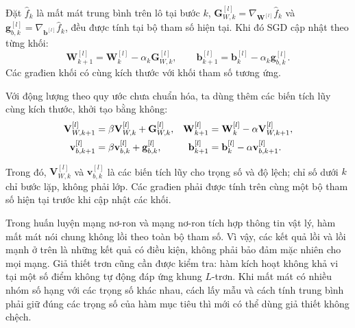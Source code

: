 Đặt $\widehat f_k$ là mất mát trung bình trên lô tại bước $k$,
$\mathbf{G}_{W,k}^{[l]}=\nabla_{\mathbf{W}^{[l]}}\widehat f_k$
và $\mathbf{g}_{b,k}^{[l]}=\nabla_{\mathbf{b}^{[l]}}\widehat f_k$,
đều được tính tại bộ tham số hiện tại. Khi đó SGD cập nhật theo từng khối:
\begin{equation}
 \mathbf{W}_{k+1}^{[l]}=\mathbf{W}_{k}^{[l]}-
                         \alpha_k\mathbf{G}_{W,k}^{[l]},\qquad
 \mathbf{b}_{k+1}^{[l]}=\mathbf{b}_{k}^{[l]}-
                         \alpha_k\mathbf{g}_{b,k}^{[l]}.
 \label{eq:sgd-network}
\end{equation}
Các građien khối có cùng kích thước với khối tham số tương ứng.

\begin{samepage}
Với động lượng theo quy ước chưa chuẩn hóa, ta dùng thêm các biến
tích lũy cùng kích thước, khởi tạo bằng không:
\begin{align}
 \mathbf{V}_{W,k+1}^{[l]}&=\beta\mathbf{V}_{W,k}^{[l]}
                             +\mathbf{G}_{W,k}^{[l]},&
 \mathbf{W}_{k+1}^{[l]}&=\mathbf{W}_{k}^{[l]}
                             -\alpha\mathbf{V}_{W,k+1}^{[l]},\notag\\
 \mathbf{v}_{b,k+1}^{[l]}&=\beta\mathbf{v}_{b,k}^{[l]}
                             +\mathbf{g}_{b,k}^{[l]},&
 \mathbf{b}_{k+1}^{[l]}&=\mathbf{b}_{k}^{[l]}
                             -\alpha\mathbf{v}_{b,k+1}^{[l]}.
 \label{eq:mom-network}
\end{align}
\end{samepage}
Trong đó, $\mathbf{V}_{W,k}^{[l]}$ và $\mathbf{v}_{b,k}^{[l]}$ là các
biến tích lũy cho trọng số và độ lệch; chỉ số dưới $k$ chỉ bước lặp,
không phải lớp. Các građien phải được tính trên cùng một bộ tham số
hiện tại trước khi cập nhật các khối.

Trong huấn luyện mạng nơ-ron và mạng nơ-ron tích hợp thông tin vật lý,
hàm mất mát nói chung không lồi theo toàn bộ tham số. Vì vậy, các kết
quả lồi và lồi mạnh ở trên là những kết quả có điều kiện, không phải
bảo đảm mặc nhiên cho mọi mạng. Giả thiết trơn cũng cần được kiểm tra:
hàm kích hoạt không khả vi tại một số điểm không tự động đáp ứng
khung $L$-trơn. Khi mất mát có nhiều nhóm số hạng với các trọng số khác
nhau, cách lấy mẫu và cách tính trung bình phải giữ đúng các trọng số
của hàm mục tiêu thì mới có thể dùng giả thiết không chệch.


